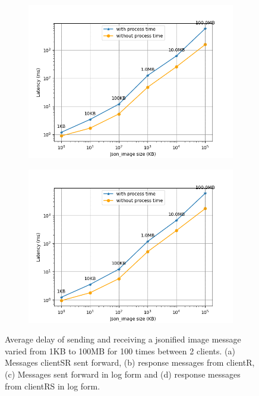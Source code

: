 \begin{figure}[htb]
\begin{subfigure}[b]{0.49\textwidth}
        \caption{} \label{fig: proportional-imagesize-b}
        \end{subfigure}
    \begin{subfigure}[b]{0.49\textwidth}
        \centering
        \includegraphics[width=\textwidth]{figures/tests/proportional_tests/log_Average_json_image_messages_sending_time_of_100_tests_1KB_to_100MB.png}\hfill 
        \caption{} \label{fig: proportional-imagesize-c}
    \end{subfigure}
    \begin{subfigure}[b]{0.49\textwidth}
        \centering
        \includegraphics[width=\textwidth]{figures/tests/proportional_tests/log_Average_json_image_messages_receiving_time_of_100_tests_1KB_to_100MB.png}\hfill 
        \caption{} \label{fig: proportional-imagesize-d}
    \end{subfigure}
    \caption{Average delay of sending and receiving a jsonified image message varied from 1KB 
    to 100MB for 100 times between 2 clients. (a) Messages clientSR sent forward, 
    (b) response messages from clientR, (c) Messages sent forward in log form 
    and (d) response messages from clientRS in log form. 
    \label{fig: proportional-imagesize}}
\end{figure}


